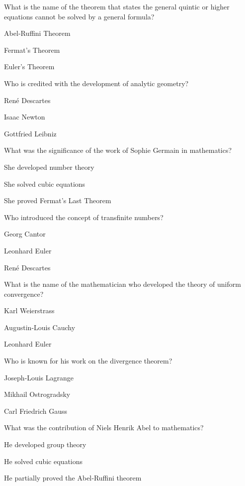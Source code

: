 \begin{enhancedmcq}{What is the name of the theorem that states the general quintic or higher equations cannot be solved by a general formula?}
\item Abel‑Ruffini Theorem
\item Fermat's Theorem
\item Euler's Theorem

\end{enhancedmcq}
\begin{enhancedmcq}{Who is credited with the development of analytic geometry?}
\item René Descartes
\item Isaac Newton
\item Gottfried Leibniz

\end{enhancedmcq}
\begin{enhancedmcq}{What was the significance of the work of Sophie Germain in mathematics?}
\item She developed number theory
\item She solved cubic equations
\item She proved Fermat's Last Theorem

\end{enhancedmcq}
\begin{enhancedmcq}{Who introduced the concept of transfinite numbers?}
\item Georg Cantor
\item Leonhard Euler
\item René Descartes

\end{enhancedmcq}
\begin{enhancedmcq}{What is the name of the mathematician who developed the theory of uniform convergence?}
\item Karl Weierstrass
\item Augustin‑Louis Cauchy
\item Leonhard Euler

\end{enhancedmcq}
\begin{enhancedmcq}{Who is known for his work on the divergence theorem?}
\item Joseph‑Louis Lagrange
\item Mikhail Ostrogradsky
\item Carl Friedrich Gauss

\end{enhancedmcq}
\begin{enhancedmcq}{What was the contribution of Niels Henrik Abel to mathematics?}
\item He developed group theory
\item He solved cubic equations
\item He partially proved the Abel‑Ruffini theorem

\end{enhancedmcq}
